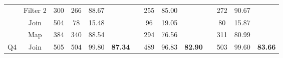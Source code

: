 \begin{table}
\begin{tabular}{cccccccccccccc}
                                & Filter 2                            & 300                             & 266                                                                     & 88.67                                                                      &                                 &           & 255                                                                     & 85.00                                                                      &                                 &           & 272                                                                     & 90.67                                                                      &                                 \\
                                & Join                                & 504                             & 78                                                                      & 15.48                                                                      &                                 &           & 96                                                                      & 19.05                                                                      &                                 &           & 80                                                                      & 15.87                                                                      &                                 \\
                                & Map                                 & 384                             & 340                                                                     & 88.54                                                                      &                                 &           & 294                                                                     & 76.56                                                                      &                                 &           & 311                                                                     & 80.99                                                                      &                                 \\ \hline
\multirow{3}{*}{Q4}             & Join                                & 505                             & 504                                                                     & 99.80                                                                      & \multirow{3}{*}{\textbf{87.34}} &           & 489                                                                     & 96.83                                                                      & \multirow{3}{*}{\textbf{82.90}} &           & 503                                                                     & 99.60                                                                      & \multirow{3}{*}{\textbf{83.66}} \\

\end{tabular}
\end{table}
